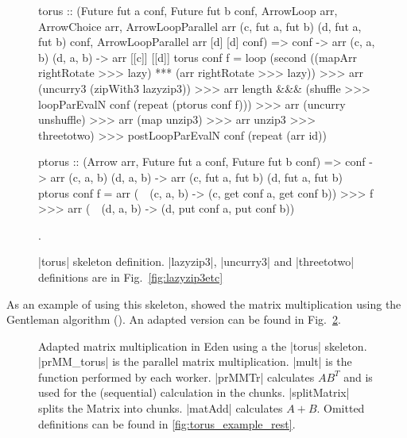 \begin{figure}[tb]
\begin{code}
torus :: (Future fut a conf, Future fut b conf,
      ArrowLoop arr, ArrowChoice arr,
      ArrowLoopParallel arr (c, fut a, fut b) (d, fut a, fut b) conf,
      ArrowLoopParallel arr [d] [d] conf) =>
      conf -> arr (c, a, b) (d, a, b) -> arr [[c]] [[d]]
torus conf f =
    loop (second ((mapArr rightRotate >>> lazy) *** (arr rightRotate >>> lazy)) >>>
        arr (uncurry3 (zipWith3 lazyzip3)) >>>
        arr length &&& (shuffle >>> loopParEvalN conf (repeat (ptorus conf f))) >>>
        arr (uncurry unshuffle) >>>
        arr (map unzip3) >>> arr unzip3 >>> threetotwo) >>>
    postLoopParEvalN conf (repeat (arr id))

ptorus :: (Arrow arr, Future fut a conf, Future fut b conf) =>
          conf ->
          arr (c, a, b) (d, a, b) ->
          arr (c, fut a, fut b) (d, fut a, fut b)
ptorus conf f =
	arr (\ ~(c, a, b) -> (c, get conf a, get conf b)) >>>
	f >>>
	arr (\ ~(d, a, b) -> (d, put conf a, put conf b))
\end{code} %
\caption{|torus| skeleton definition. |lazyzip3|, |uncurry3| and |threetotwo| definitions are in Fig.~\ref{fig:lazyzip3etc}}.
\label{fig:torus}
\end{figure}
As an example of using this skeleton, \citet{Eden:SkeletonBookChapter02} showed the matrix multiplication using the Gentleman algorithm (\citeyear{Gentleman1978}). An adapted version can be found in Fig.~\ref{fig:torusMatMult}.
\begin{figure}[tb]
\caption{Adapted matrix multiplication in Eden using a the |torus| skeleton. |prMM_torus| is the parallel matrix multiplication. |mult| is the function performed by each worker. |prMMTr| calculates $AB^T$ and is used for the (sequential) calculation in the chunks. |splitMatrix| splits the Matrix into chunks. |matAdd| calculates $A + B$. Omitted definitions can be found in \ref{fig:torus_example_rest}. }
\label{fig:torusMatMult}
\end{figure}
